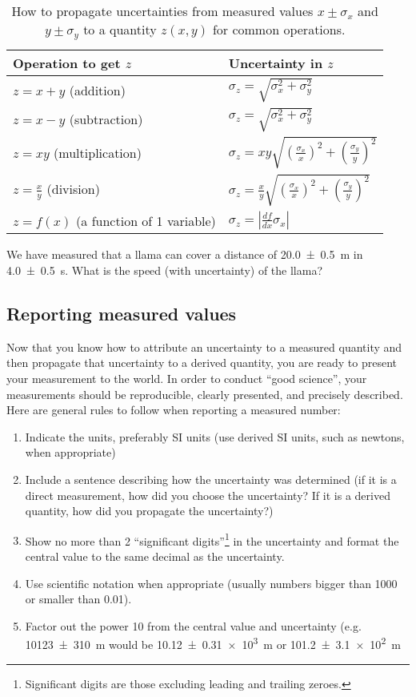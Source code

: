 \begin{table}[!h]
\centering
\begin{tabular}{p{2.5in}p{2in}} 
\textbf{Operation to get $z$} &\textbf{Uncertainty in $z$} \\
\hline
\hline
$z=x+y$ (addition) &  $\sigma_z=\sqrt{\sigma_x^2+\sigma_y^2}$ \\ \hline
$z=x-y$ (subtraction) & $\sigma_z=\sqrt{\sigma_x^2+\sigma_y^2}$ \\ \hline
$z=xy$ (multiplication) & $\sigma_z=xy\sqrt{\left(\frac{\sigma_x}{x}\right)^2+\left(\frac{\sigma_y}{y}\right)^2}$ \\ \hline
$z=\frac{x}{y}$ (division) & $\sigma_z=\frac{x}{y}\sqrt{\left(\frac{\sigma_x}{x}\right)^2+\left(\frac{\sigma_y}{y}\right)^2}$ \\ \hline
$z=f(x)$ (a function of 1 variable) &$\sigma_z=\left|\frac{df}{dx}\sigma_x \right|$ \\ \hline
\end{tabular}
\caption{\label{tab:ModelAndExperiment:prop_uncertainties} How to propagate uncertainties from measured values $x\pm\sigma_x$ and $y\pm\sigma_y$ to a quantity $z(x,y)$ for common operations.}
\end{table}

\begin{checkpoint}{We have measured that a llama can cover a distance of \SI{20.0 \pm 0.5}{m} in \SI{4.0\pm 0.5}{s}. What is the speed (with uncertainty) of the llama?}
\end{checkpoint}


\subsection{Reporting measured values}
Now that you know how to attribute an uncertainty to a measured quantity and then propagate that uncertainty to a derived quantity, you are ready to present your measurement to the world. In order to conduct ``good science'', your measurements should be reproducible, clearly presented, and precisely described. Here are general rules to follow when reporting a measured number:
\begin{enumerate}
\item Indicate the units, preferably SI units (use derived SI units, such as newtons, when appropriate)
\item Include a sentence describing how the uncertainty was determined (if it is a direct measurement, how did you choose the uncertainty? If it is a derived quantity, how did you propagate the uncertainty?)
\item Show no more than 2 ``significant digits''\footnote{Significant digits are those excluding leading and trailing zeroes.} in the uncertainty and format the central value to the same decimal as the uncertainty. 
\item Use scientific notation when appropriate (usually numbers bigger than 1000 or smaller than 0.01).
\item Factor out the power 10 from the central value and uncertainty (e.g. \SI{10123\pm 310}{m} would be \SI{10.12\pm 0.31e3}{m} or \SI{101.2\pm 3.1e2}{m} 
\end{enumerate}

